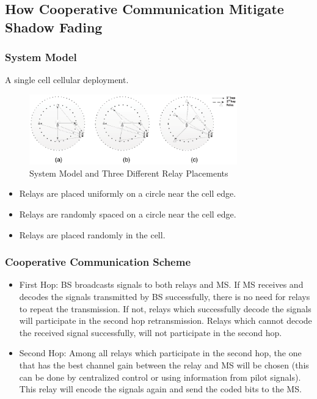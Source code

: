 \documentclass{beamer}
\begin{document}
\subsection{How Cooperative Communication Mitigate Shadow Fading}
\begin{frame}
\frametitle{System Model}
A single cell cellular deployment.
\begin{figure}
\centering
\includegraphics[width=9cm]{abc.eps}
\caption{System Model and Three Different Relay Placements}
\label{threemodels}
\end{figure}
\begin{itemize}
\item Relays are placed uniformly on a circle near the cell edge.
\item Relays are randomly spaced on a circle near the cell edge.
\item Relays are placed randomly in the cell.
\end{itemize}
\end{frame}
%
\begin{frame}
\frametitle{Cooperative Communication Scheme}
\begin{itemize}
\item First Hop: BS broadcasts signals to both relays and MS. If MS receives and decodes the signals transmitted by BS successfully, there is no need for relays to repeat the transmission. If not, relays which successfully decode the signals will participate in the second hop retransmission. Relays which cannot decode the received signal successfully, will not participate in the second hop.
\item Second Hop: Among all relays which participate in the second hop, the one that has the best channel gain between the relay and MS will be chosen (this can be done by centralized control or using information from pilot signals). This relay will encode the signals again and send the coded bits to the MS.
\end{itemize}
\end{frame}
%
\end{document}
